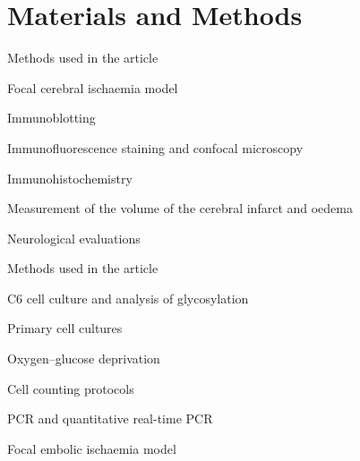 \documentclass[bigger]{beamer}
\begin{document}
\section{Materials and Methods}
\label{sec:orgheadline14}
\begin{frame}[label={sec:orgheadline11}]{Methods used in the article}
\begin{block}{Focal cerebral ischaemia model}
\end{block}
\begin{block}{Immunoblotting}
\end{block}
\begin{block}{Immunofluorescence staining and confocal microscopy}
\end{block}
\begin{block}{Immunohistochemistry}
\end{block}
\begin{block}{Measurement of the volume of the cerebral infarct and oedema}
\end{block}
\begin{block}{Neurological evaluations}
\end{block}
\end{frame}
\begin{frame}[label={sec:orgheadline12}]{Methods used in the article}
\begin{block}{C6 cell culture and analysis of glycosylation}
\end{block}
\begin{block}{Primary cell cultures}
\end{block}
\begin{block}{Oxygen–glucose deprivation}
\end{block}
\begin{block}{Cell counting protocols}
\end{block}
\begin{block}{PCR and quantitative real-time PCR}
\end{block}
\begin{block}{Focal embolic ischaemia model}
\end{block}
\end{frame}
\end{document}
